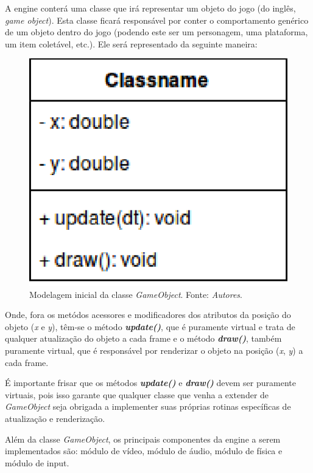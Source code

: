     A engine conterá uma classe que irá representar um objeto do jogo (do inglês, \textit{game object}). Esta classe ficará responsável por conter o comportamento genérico de um objeto dentro do jogo (podendo este ser um personagem, uma plataforma, um item coletável, etc.). Ele será representado da seguinte maneira:

    \vspace{\onelineskip}

    \begin{figure}[H]
      \centering \includegraphics[keepaspectratio=true,scale=0.6]{figuras/game-object.eps}
      \caption{Modelagem inicial da classe \textit{GameObject}. Fonte: \textit{Autores}.}
      \label{game-object}
    \end{figure}

    Onde, fora os metódos acessores e modificadores dos atributos da posição do objeto (\textit{x} e \textit{y}), têm-se o método \textbf{\textit{update()}}, que é puramente virtual e trata de qualquer atualização do objeto a cada frame e o método \textbf{\textit{draw()}}, também puramente virtual, que é responsável por renderizar o objeto na posição (\textit{x}, \textit{y}) a cada frame.

    É importante frisar que os métodos \textbf{\textit{update()}} e \textbf{\textit{draw()}} devem ser puramente virtuais, pois isso garante que qualquer classe que venha a extender de \textit{GameObject} seja obrigada a implementer suas próprias rotinas específicas de atualização e renderização.

    Além da classe \textit{GameObject}, os principais componentes da engine a serem implementados são: módulo de vídeo, módulo de áudio, módulo de física e módulo de input.

